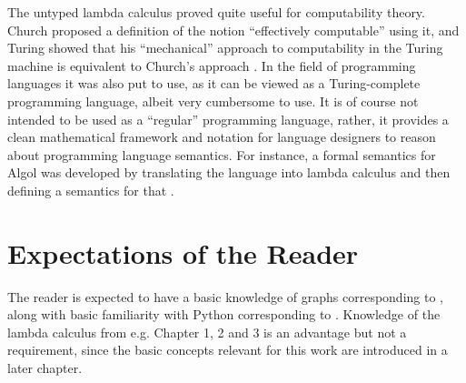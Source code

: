 The untyped lambda calculus proved quite useful for computability theory.
Church proposed a definition of the notion ``effectively computable'' using
it, and Turing showed that his ``mechanical'' approach to computability in the
Turing machine is equivalent to Church's approach
\cite{Turing1936,Turing1937}. In the field of programming languages it was
also put to use, as it can be viewed as a Turing-complete programming
language, albeit very cumbersome to use. It is of course not intended to be
used as a ``regular'' programming language, rather, it provides a clean
mathematical framework and notation for language designers to reason about
programming language semantics. For instance, a formal semantics for Algol was
developed by translating the language into lambda calculus and then defining a
semantics for that \cite{Landin1965}.

\section{Expectations of the Reader}

The reader is expected to have a basic knowledge of graphs corresponding to
\cite{Trudeau1994}, along with basic familiarity with Python corresponding to
\cite{Zelle2004}. Knowledge of the lambda calculus from e.g. \cite{Barendregt}
Chapter 1, 2 and 3 is an advantage but not a requirement, since the basic
concepts relevant for this work are introduced in a later chapter.
